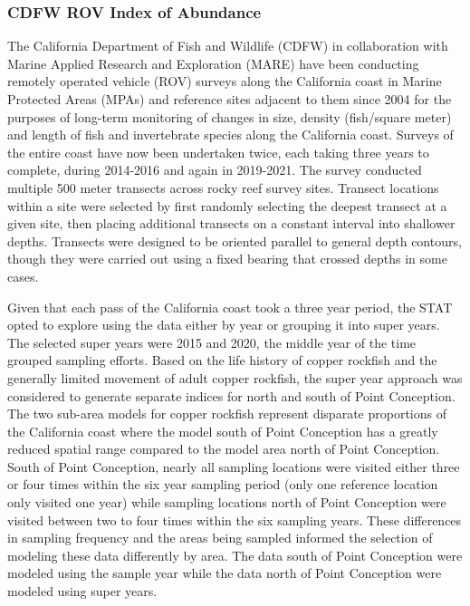 \documentclass[11pt,
  english,
  letterpaper,
]{article}
\begin{document}
\newpage

\hypertarget{cdfw-rov-index}{%
\subsubsection{CDFW ROV Index of Abundance}\label{cdfw-rov-index}}

The California Department of Fish and Wildlife (CDFW) in collaboration with Marine Applied Research and Exploration (MARE) have been conducting remotely operated vehicle (ROV) surveys along the California coast in Marine Protected Areas (MPAs) and reference sites adjacent to them since 2004 for the purposes of long-term monitoring of changes in size, density (fish/square meter) and length of fish and invertebrate species along the California coast. Surveys of the entire coast have now been undertaken twice, each taking three years to complete, during 2014-2016 and again in 2019-2021. The survey conducted multiple 500 meter transects across rocky reef survey sites. Transect locations within a site were selected by first randomly selecting the deepest transect at a given site, then placing additional transects on a constant interval into shallower depths. Transects were designed to be oriented parallel to general depth contours, though they were carried out using a fixed bearing that crossed depths in some cases.

Given that each pass of the California coast took a three year period, the STAT opted to explore using the data either by year or grouping it into super years. The selected super years were 2015 and 2020, the middle year of the time grouped sampling efforts. Based on the life history of copper rockfish and the generally limited movement of adult copper rockfish, the super year approach was considered to generate separate indices for north and south of Point Conception. The two sub-area models for copper rockfish represent disparate proportions of the California coast where the model south of Point Conception has a greatly reduced spatial range compared to the model area north of Point Conception. South of Point Conception, nearly all sampling locations were visited either three or four times within the six year sampling period (only one reference location only visited one year) while sampling locations north of Point Conception were visited between two to four times within the six sampling years. These differences in sampling frequency and the areas being sampled informed the selection of modeling these data differently by area. The data south of Point Conception were modeled using the sample year while the data north of Point Conception were modeled using super years.
\end{document}
